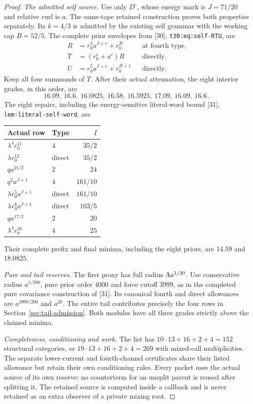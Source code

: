 \documentclass[11pt]{article}
\numberwithin{equation}{section}
\theoremstyle{remark}\newtheorem{remark}[theorem]{Remark}
\newcommand{\src}[1]{\texttt{\nolinkurl{#1}}}
\begin{document}
\begin{proof}
\emph{The admitted self source.}
Use only $D^\circ$, whose energy mark is $J=71/20$ and relative
curl is $a$. The same-tape retained construction proves both
properties separately. Its $k=4/3$ is admitted by the existing
self grammar with the working cap $B=52/5$.
The complete prior envelopes from [30], \src{t30:eq:self-RTU}, are
\begin{align*}
 R&=r_0^4a^{J+c}+r_0^B &&\text{at fourth type},\\
 T&=(r_0^c+a^c)R &&\text{directly},\\
 U&=r_0^5a^{J+c}+r_0^{B+1} &&\text{directly}.
\end{align*}
Keep all four summands of $T$. After their actual attenuation,
the eight interior grades, in this order, are
\[
 16.09,\ 16.6,\ 16.0825,\ 16.58,\ 16.5925,\ 17.09,
 \ 16.09,\ 16.6\,.
\]
The eight repairs, including the energy-sensitive literal-word
bound [31], \src{lem:literal-self-word}, are
\begin{center}\small
\begin{tabular}{llr}
\toprule
Actual row&Type&$I$\\
\midrule
$\lambda^4r_0^{11}$&$4$&$35/2$\\
$\lambda r_0^{12}$&direct&$35/2$\\
$qa^{21/2}$&$2$&$24$\\
$q^2a^{J+1}$&$4$&$161/10$\\
$\lambda r_0^5a^{J+1}$&direct&$161/10$\\
$\lambda r_0^8a^{J+1}$&direct&$103/5$\\
$qa^{17/2}$&$2$&$20$\\
$\lambda^4r_0^{16}$&$4$&$25$\\
\bottomrule
\end{tabular}
\end{center}
Their complete prefix and final minima, including the eight priors,
are $14.59$ and $18.0825$.

\emph{Pure and tail reserves.}
The first proxy has full radius $\Lambda a^{1/20}$. Use conservative
radius $a^{1/200}$, pure prior order $4000$ and force cutoff $3999$,
as in the completed pure covariance construction of [31]. Its
canonical fourth and direct allowances are $a^{3999/200}$ and
$a^{20}$. The entire tail contributes precisely the four rows in
Section~\ref{sec:tail-admission}. Both modules have all three
grades strictly above the claimed minima.

\emph{Completeness, conditioning and work.}
The list has $10\cdot13+16+2+4=152$ structural categories,
or $19\cdot13+16+2+4=269$ with mixed-call multiplicities.
The separate lower-current and fourth-channel certificates share
their listed allowance but retain their own conditioning rules.
Every packet uses the actual source of its own reserve; no
counterterm for an unsplit parent is reused after splitting it.
The retained source is computed inside a callback and is never
retained as an extra observer of a private mixing root.


\end{proof}
\end{document}
